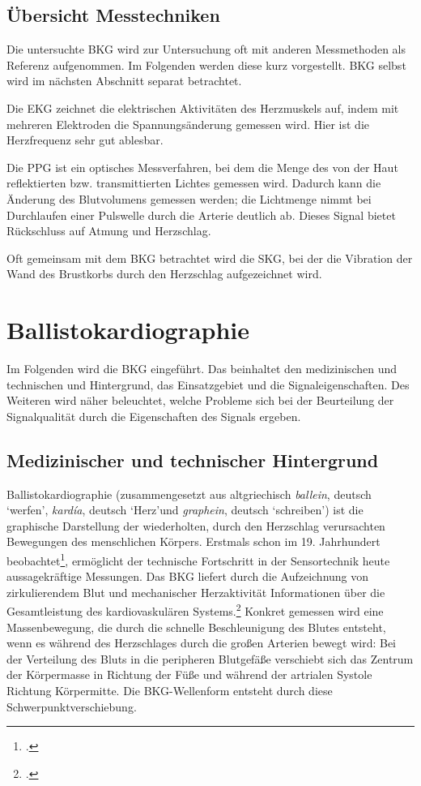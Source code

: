 	\subsection{Übersicht Messtechniken}
	
	Die untersuchte \ac{BKG} wird zur Untersuchung oft mit anderen Messmethoden als Referenz aufgenommen. Im Folgenden werden diese kurz vorgestellt. \ac{BKG} selbst wird im nächsten Abschnitt separat betrachtet.
	
	Die \ac{EKG} zeichnet die elektrischen Aktivitäten des Herzmuskels auf, indem mit mehreren Elektroden die Spannungsänderung gemessen wird. Hier ist die Herzfrequenz sehr gut ablesbar.
	
	Die \ac{PPG} ist ein optisches Messverfahren, bei dem die Menge des von der Haut reflektierten bzw. transmittierten Lichtes gemessen wird. Dadurch kann die Änderung des Blutvolumens gemessen werden; die Lichtmenge nimmt bei Durchlaufen einer Pulswelle durch die Arterie deutlich ab. Dieses Signal bietet Rückschluss auf Atmung und Herzschlag.
	
	Oft gemeinsam mit dem \ac{BKG} betrachtet wird die \ac{SKG}, bei der die Vibration der Wand des Brustkorbs durch den Herzschlag aufgezeichnet wird.

	\section{Ballistokardiographie}\label{ballistokardiographie}
	
	Im Folgenden wird die \acl{BKG} eingeführt. Das beinhaltet den medizinischen und technischen und Hintergrund, das Einsatzgebiet und die Signaleigenschaften. Des Weiteren wird näher beleuchtet, welche Probleme sich bei der Beurteilung der Signalqualität durch die Eigenschaften des Signals ergeben.
	
	\subsection{Medizinischer und technischer Hintergrund}
	
	Ballistokardiographie (zusammengesetzt aus altgriechisch \textit{ballein}, deutsch \textquoteleft werfen\textquoteright, \textit{kardía}, deutsch \textquoteleft Herz\textquoteright und \textit{graphein}, deutsch \textquoteleft schreiben\textquoteright) ist die graphische Darstellung der wiederholten, durch den Herzschlag verursachten Bewegungen des menschlichen Körpers. Erstmals schon im 19. Jahrhundert beobachtet\footcite[Vgl.][]{Gordon1877}, ermöglicht der technische Fortschritt in der Sensortechnik heute aussagekräftige Messungen. Das \ac{BKG} liefert durch die Aufzeichnung von zirkulierendem Blut und mechanischer Herzaktivität Informationen über die Gesamtleistung des kardiovaskulären Systems.\footcite[Vgl.][]{Pinheiro2010} Konkret gemessen wird eine Massenbewegung, die durch die schnelle Beschleunigung des Blutes entsteht, wenn es während des Herzschlages durch die großen Arterien bewegt wird: Bei der Verteilung des Bluts in die peripheren Blutgefäße verschiebt sich das Zentrum der Körpermasse in Richtung der Füße und während der artrialen Systole Richtung Körpermitte. Die \ac{BKG}-Wellenform entsteht durch diese Schwerpunktverschiebung.
	
